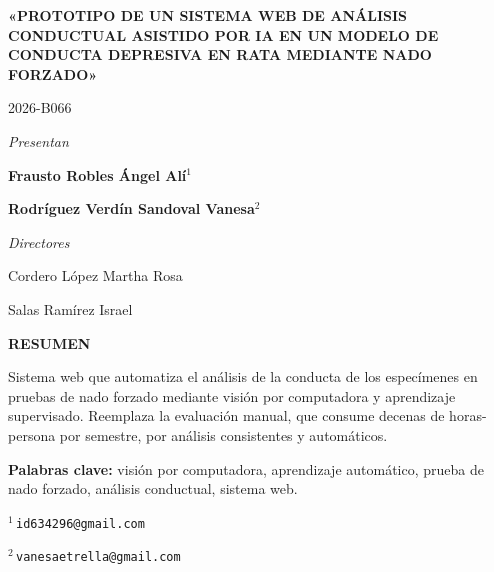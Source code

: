 \begin{center}
{\large\bfseries
«PROTOTIPO DE UN SISTEMA WEB DE ANÁLISIS CONDUCTUAL ASISTIDO POR IA EN UN
MODELO DE CONDUCTA DEPRESIVA EN RATA MEDIANTE NADO FORZADO»\par}

\vspace{0.4cm}
{\normalsize 2026-B066\par}

\vspace{0.8cm}
{\itshape Presentan\par}

\vspace{0.4cm}
{\bfseries Frausto Robles Ángel Alí$^{1}$\par}
\vspace{0.2cm}
{\bfseries Rodríguez Verdín Sandoval Vanesa$^{2}$\par}

\vspace{0.7cm}
{\itshape Directores\par}

\vspace{0.4cm}
\noindent
\begin{minipage}[t]{0.48\textwidth}
  \centering
  Cordero López Martha Rosa
\end{minipage}%
\hfill
\begin{minipage}[t]{0.48\textwidth}
  \centering
  Salas Ramírez Israel
\end{minipage}

\vspace{0.8cm}
{\small\bfseries RESUMEN}

\vspace{0.3cm}
{\small\noindent
Sistema web que automatiza el análisis de la conducta de los especímenes en pruebas de nado forzado mediante visión por computadora y aprendizaje supervisado. Reemplaza la evaluación manual, que consume decenas de horas-persona por semestre, por análisis consistentes y automáticos.

\vspace{0.4cm}
\noindent\textbf{Palabras clave:} visión por computadora, aprendizaje automático, prueba de nado forzado, análisis conductual, sistema web.
}

\end{center}

\vspace*{\fill}
{\footnotesize
\noindent $^{1}$\,\texttt{id634296@gmail.com}\par
\noindent $^{2}$\,\texttt{vanesaetrella@gmail.com}
}
